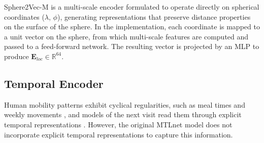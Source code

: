 Sphere2Vec-M \cite{mai2023sphere2vecgeneralpurposelocationrepresentation} is a multi-scale encoder formulated to operate directly on spherical coordinates ($\lambda$, $\phi$), generating representations that preserve distance properties on the surface of the sphere. In the implementation, each coordinate is mapped to a unit vector on the sphere, from which multi-scale features are computed and passed to a feed-forward network. The resulting vector is projected by an MLP to produce $\mathbf{E}_{loc} \in \mathbb{R}^{64}$.

\subsection{Temporal Encoder}

Human mobility patterns exhibit cyclical regularities, such as meal times and weekly movements \cite{cho2011gowalla}, and models of the next visit read them through explicit temporal representations \cite{sun2020go}. However, the original MTLnet model does not incorporate explicit temporal representations to capture this information.


